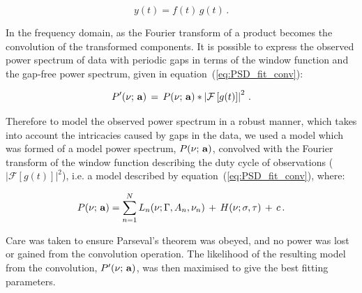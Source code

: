 \begin{equation}
y(t)  = f(t) \, g(t)
\label{eq:timeseries} \, .
\end{equation}

In the frequency domain, as the Fourier transform of a product becomes the convolution of the transformed components. It is possible to express the observed power spectrum of data with periodic gaps in terms of the window function and the gap-free power spectrum, given in equation~(\ref{eq:PSD_fit_conv}):

\begin{equation}
P'(\nu; \,{\bf a}) \, = \, P(\nu; \,{\bf a}) * \left|\mathcal{F}\left[g(t)\right]\right|^2 \, .
\label{eq:PSD_fit_conv}
\end{equation}

Therefore to model the observed power spectrum in a robust manner, which takes into account the intricacies caused by gaps in the data, we used a model which was formed of a model power spectrum, $P(\nu; \,{\bf a})$, convolved with the Fourier transform of the window function describing the duty cycle of observations ($\left|\mathcal{F}\left[g(t)\right]\right|^2$), i.e. a model described by equation~(\ref{eq:PSD_fit_conv}), where:


\begin{equation}
P(\nu; \,{\bf a}) = \sum_{n=1}^{N} L_n(\nu; \Gamma, A_n, \nu_n) \, + \, H(\nu; \sigma, \tau) \, + \, c \, .
\label{eq:PSD_model}
\end{equation}

Care was taken to ensure Parseval's theorem was obeyed, and no power was lost or gained from the convolution operation. The likelihood of the resulting model from the convolution, $P'(\nu; \,{\bf a})$, was then maximised to give the best fitting parameters.


